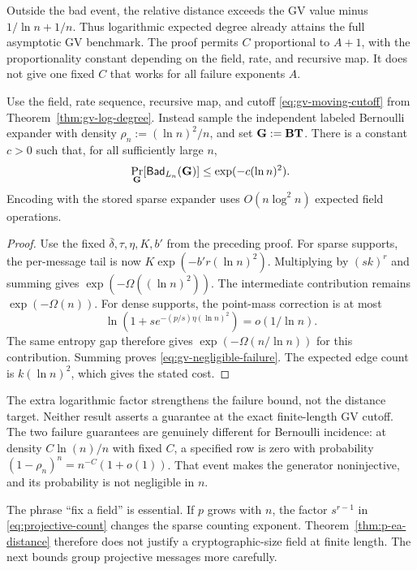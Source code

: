 Outside the bad event, the relative distance exceeds the GV value minus
$1/\ln n+1/n$.  Thus logarithmic expected degree already attains the full
asymptotic GV benchmark.  The proof permits $C$ proportional to $A+1$, with
the proportionality constant depending on the field, rate, and recursive map.
It does not give one fixed $C$ that works for all failure exponents $A$.

\begin{corollary}
\label{cor:gv-negligible}
Use the field, rate sequence, recursive map, and cutoff
\eqref{eq:gv-moving-cutoff} from Theorem~\ref{thm:gv-log-degree}.
Instead sample the independent labeled Bernoulli expander with density
$\rho_n:=(\ln n)^2/n$, and set $\mathbf G:=\mathbf B\mathbf T$.
There is a constant $c>0$ such that, for all sufficiently large $n$,
\begin{equation}
 \Pr_{\mathbf G}[\mathsf{Bad}_{L_n}(\mathbf G)]\leq\exp(-c(\ln n)^2).
 \label{eq:gv-negligible-failure}
\end{equation}
Encoding with the stored sparse expander uses $O(n\log^2 n)$ expected field
operations.
\end{corollary}

\begin{proof}
Use the fixed $\bar\delta,\tau,\eta,K,b'$ from the preceding proof.
For sparse supports, the per-message tail is now
$K\exp(-b'r(\ln n)^2)$.  Multiplying by $(sk)^r$ and summing gives
$\exp(-\Omega((\ln n)^2))$.
The intermediate contribution remains $\exp(-\Omega(n))$.
For dense supports, the point-mass correction is at most
\[
 \ln\!\left(1+s e^{-(p/s)\eta(\ln n)^2}\right)=o(1/\ln n).
\]
The same entropy gap therefore gives $\exp(-\Omega(n/\ln n))$ for this
contribution.  Summing proves \eqref{eq:gv-negligible-failure}.
The expected edge count is $k(\ln n)^2$, which gives the stated cost.
\end{proof}

The extra logarithmic factor strengthens the failure bound, not the distance
target.  Neither result asserts a guarantee at the exact finite-length GV
cutoff.  The two failure guarantees are genuinely different for Bernoulli
incidence:
at density $C\ln(n)/n$ with fixed $C$, a specified row is zero with
probability $(1-\rho_n)^n=n^{-C}(1+o(1))$.
That event makes the generator noninjective, and its probability is not
negligible in $n$.

The phrase ``fix a field'' is essential.  If $p$ grows with $n$, the factor
$s^{r-1}$ in \eqref{eq:projective-count} changes the sparse counting exponent.
Theorem~\ref{thm:p-ea-distance} therefore does not justify a cryptographic-size
field at finite length.  The next bounds group projective messages more
carefully.

